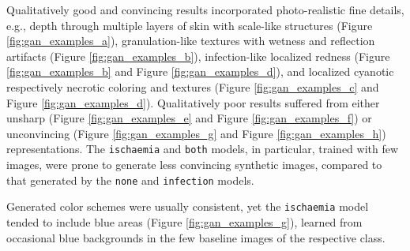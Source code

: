 \documentclass[runningheads]{llncs}
\begin{document}
Qualitatively good and convincing results incorporated photo-realistic fine details, e.g., depth through multiple layers of skin with scale-like structures (Figure \ref{fig:gan_examples_a}), granulation-like textures with wetness and reflection artifacts (Figure \ref{fig:gan_examples_b}), infection-like localized redness (Figure \ref{fig:gan_examples_b} and Figure \ref{fig:gan_examples_d}), and localized cyanotic respectively necrotic coloring and textures (Figure \ref{fig:gan_examples_c} and Figure \ref{fig:gan_examples_d}). Qualitatively poor results suffered from either unsharp (Figure \ref{fig:gan_examples_e} and Figure \ref{fig:gan_examples_f}) or unconvincing (Figure \ref{fig:gan_examples_g} and Figure \ref{fig:gan_examples_h}) representations. The \texttt{ischaemia} and \texttt{both} models, in particular, trained with few images, were prone to generate less convincing synthetic images, compared to that generated by the \texttt{none} and \texttt{infection} models.

Generated color schemes were usually consistent, yet the \texttt{ischaemia} model tended to include blue areas (Figure \ref{fig:gan_examples_g}), learned from occasional blue backgrounds in the few baseline images of the respective class.
\end{document}
